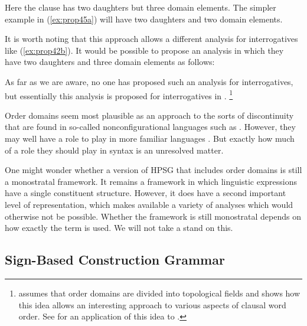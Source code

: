 \documentclass[output=paper,biblatex,babelshorthands,newtxmath,draftmode,colorlinks,citecolor=brown]{langscibook}
\begin{document}
\ea\label{ex:prop46}
\z

\noindent
Here the clause has two daughters but three domain elements. The simpler example in (\ref{ex:prop45a}) will have two daughters and two domain elements.

It is worth noting that this approach allows a different analysis for interrogatives like (\ref{ex:prop42b}). It would be possible to propose an analysis in which they have two daughters and three domain elements as follows:

\ea\label{ex:prop47}
\z

\noindent
As far as we are aware, no one has proposed such an analysis for  interrogatives, but
essentially this analysis is proposed for  interrogatives in \citet[81]{Kathol2000a}.%
%
\footnote{\citet{Kathol2000a} assumes that order domains are divided into topological fields and
  shows how this idea allows an interesting approach to various aspects of clausal word order. See
  \citet{Borsley:06} for an application of this idea to .} 
%

Order domains seem most plausible as an approach to the sorts of discontinuity that are found in
so-called nonconfigurational languages such as  \citep{DS99a}. However, they may well
have a role to play in more familiar languages \citep{BGM99a,Chaves2014a-u}. But exactly how much of
a role they should play in syntax is an unresolved matter. 

One might wonder whether a version of HPSG that includes order domains is still a monostratal
framework. It remains a framework in which linguistic expressions have a single constituent
structure. However, it does have a second important level of representation, which makes available a
variety of analyses which would otherwise not be possible. Whether the framework is still
monostratal depends on how exactly the term is used. We will not take a stand on this. 

\subsection{Sign-Based Construction Grammar}\label{sec:prop7.2}
\label{prop:sec-sbcg}
\end{document}
